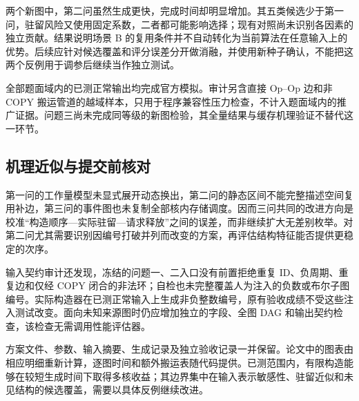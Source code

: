 两个新图中，第二问虽然生成更快，完成时间却明显增加。其五类候选少于第一问，驻留风险又使用固定系数，二者都可能影响选择；现有对照尚未识别各因素的独立贡献。结果说明场景 B 的复用条件并不自动转化为当前算法在任意输入上的优势。后续应针对候选覆盖和评分误差分开做消融，并使用新种子确认，不能把这两个反例用于调参后继续当作独立测试。

全部题面域内的已测正常输出均完成官方模拟。审计另含直接 Op--Op 边和非 COPY 搬运管道的越域样本，只用于程序兼容性压力检查，不计入题面域内的推广证据。问题三尚未完成同等级的新图检验，其全量结果与缓存机理验证不替代这一环节。

\subsection{机理近似与提交前核对}
第一问的工作量模型未显式展开动态换出，第二问的静态区间不能完整描述空间复用补边，第三问的事件图也未复制全部核内存储调度。因而三问共同的改进方向是校准“构造顺序—实际驻留—请求释放”之间的误差，而非继续扩大无差别枚举。对第二问尤其需要识别因编号打破并列而改变的方案，再评估结构特征能否提供更稳定的次序。

输入契约审计还发现，冻结的问题一、二入口没有前置拒绝重复 ID、负周期、重复边和仅经 COPY 闭合的非法环；自检也未完整覆盖人为注入的负数或布尔子图编号。实际构造器在已测正常输入上生成非负整数编号，原有验收成绩不受这些注入测试改变。面向未知来源图时仍应增加独立的字段、全图 DAG 和输出契约检查，该检查无需调用性能评估器。

方案文件、参数、输入摘要、生成记录及独立验收记录一并保留。论文中的图表由相应明细重新计算，逐图时间和额外搬运表随代码提供。已测范围内，有限构造能够在较短生成时间下取得多核收益；其边界集中在输入表示敏感性、驻留近似和未见结构的候选覆盖，需要以具体反例继续改进。
